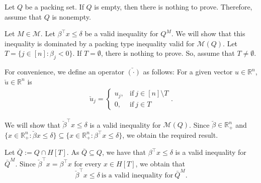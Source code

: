 \documentclass[11pt]{article}
\newcommand{\R}{\mathbb{R}}
\renewcommand{\L}{\mathcal{L}}
\newcommand{\Mset}{M}
\newcommand{\M}{\mathcal{\Mset}}
\newcommand{\bpar}{\beta}
\begin{document}
Let $Q$ be a packing set. If $Q$ is empty, then there is nothing to prove. Therefore, assume that $Q$ is nonempty.

Let $\Mset \in \M$. Let $\bpar^\top x \le \delta$ be a valid inequality for $Q^\Mset$. We will show that  this inequality is dominated by a packing type inequality valid for $\M(Q)$. Let $T = \{ j \in [n] : \bpar_j < 0\}$. If $T = \emptyset$, there is nothing to prove. So, assume that $T \neq \emptyset$. 


For convenience, we define an operator $\breve{(\cdot)}$ as follows: For a given vector $u \in \R^n$,  $\breve{u} \in \R^n$ is 
%
	\begin{align}
\breve{u}_j = \left \{
\begin{array}{rl}
u_j, & \text{if} \ j \in [n] \setminus T \\
0, & \text{if} \ j \in T
\end{array}
\right. .  \label{eq:opBreve}
	\end{align}

We will show that $\breve \bpar^\top x \le \delta$ is a valid inequality for $\M(Q)$.
Since $\breve \bpar \in \R^n_+$ and $\{x \in \R^n_+ : \breve \bpar x \le \delta \} \subseteq \{x \in \R^n_+ : \bpar^\top  x \le \delta \}$, we obtain the required result.

Let $\bar Q := Q \cap H[T]$.
As $\bar Q \subseteq Q$, we have that $\bpar^\top x \le \delta$ is a valid inequality for ${\bar Q}^\Mset$.  Since $\breve \bpar^\top x = \bpar^\top x$ for every $x \in H[T]$, we obtain that 
\begin{equation}
\label{betaineqValidForQbarM}
\breve \bpar^\top x \le \delta \ \text{is a valid inequality for}  \ {\bar Q}^\Mset. 
\end{equation}
\end{document}
